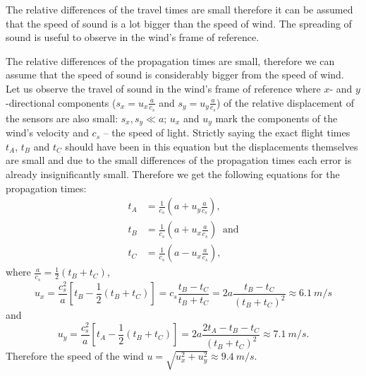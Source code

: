 \hinteng
The relative differences of the travel times are small therefore it can be assumed that the speed of sound is a lot bigger than the speed of wind. The spreading of sound is useful to observe in the wind’s frame of reference.

\solueng
The relative differences of the propagation times are small, therefore we can assume that the speed of sound is considerably bigger from the speed of wind. Let us observe the travel of sound in the wind’s frame of reference where $x$- and $y$-directional components ($s_x=u_x\frac a{c_s}$ and $s_y=u_y\frac a{c_s}$) of the relative displacement of the sensors are also small: $s_x, s_y\ll a$; $u_x$ and $u_y$ mark the components of the wind’s velocity and $c_s$ – the speed of light. Strictly saying the exact flight times $t_A$, $t_B$ and $t_C$ should have been in this equation but the displacements themselves are small and due to the small differences of the propagation times each error is already insignificantly small. Therefore we get the following equations for the propagation times:
\begin{align*}
t_A&=\frac 1{c_s}\left(a+u_y\frac a{c_s}\right),\\
t_B&=\frac 1{c_s}\left(a+u_x\frac a{c_s}\right)\;\; \mbox{and}\\
t_C&=\frac 1{c_s}\left(a-u_x\frac a{c_s}\right),
\end{align*}
where $ \frac a{c_s}=\frac 12(t_B+t_C)$,
$$u_x=\frac {c_s^2}a\left[t_B-\frac 12(t_B+t_C)\right]=c_s\frac{t_B-t_C}{t_B+t_C}=2a\frac{t_B-t_C}{(t_B+t_C)^2}\approx \SI{6.1}{m/s}$$
and
$$u_y=\frac {c_s^2}a\left[t_A-\frac 12(t_B+t_C)\right]=2a\frac{2t_A-t_B-t_C}{(t_B+t_C)^2}\approx \SI{7.1}{m/s}.$$
Therefore the speed of the wind $u=\sqrt{u_x^2+u_y^2}\approx \SI{9.4}{m/s}$.
\probend